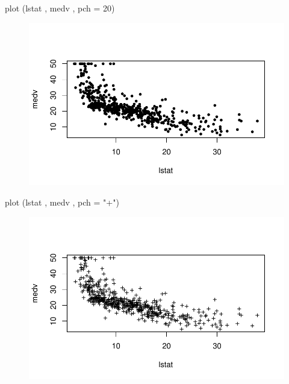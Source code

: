 \documentclass[
  letterpaper,
  DIV=11,
  numbers=noendperiod]{scrartcl}
\newenvironment{Shaded}{\begin{snugshade}}{\end{snugshade}}
\newcommand{\AttributeTok}[1]{\textcolor[rgb]{0.40,0.45,0.13}{#1}}
\newcommand{\DecValTok}[1]{\textcolor[rgb]{0.68,0.00,0.00}{#1}}
\newcommand{\FunctionTok}[1]{\textcolor[rgb]{0.28,0.35,0.67}{#1}}
\newcommand{\NormalTok}[1]{\textcolor[rgb]{0.00,0.23,0.31}{#1}}
\newcommand{\StringTok}[1]{\textcolor[rgb]{0.13,0.47,0.30}{#1}}
\begin{document}
\begin{Shaded}
\begin{Highlighting}[]
\FunctionTok{plot}\NormalTok{ (lstat , medv , }\AttributeTok{pch =} \DecValTok{20}\NormalTok{)}
\end{Highlighting}
\end{Shaded}

\begin{figure}[H]

{\centering \includegraphics{Regresion-lineal-simple-y-multiple_files/figure-pdf/unnamed-chunk-12-3.pdf}

}

\end{figure}

\begin{Shaded}
\begin{Highlighting}[]
\FunctionTok{plot}\NormalTok{ (lstat , medv , }\AttributeTok{pch =} \StringTok{"+"}\NormalTok{)}
\end{Highlighting}
\end{Shaded}

\begin{figure}[H]

{\centering \includegraphics{Regresion-lineal-simple-y-multiple_files/figure-pdf/unnamed-chunk-12-4.pdf}

}

\end{figure}
\end{document}
